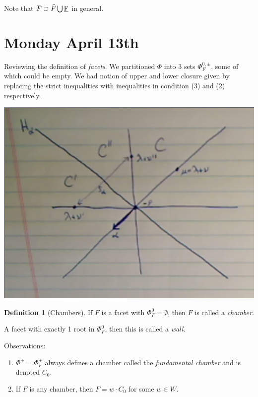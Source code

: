 \documentclass[11pt]{scrartcl}
\theoremstyle{definition}
\theoremstyle{theorem}
\theoremstyle{proof}
\theoremstyle{definition}
\newtheorem{definition}{Definition}[theorem]
\theoremstyle{break}
\theoremstyle{problem}
\providecommand{\tightlist}{%
  \setlength{\itemsep}{0pt}\setlength{\parskip}{0pt}}
\newcommand{\union}[0]{\bigcup}
\renewcommand{\bar}[1]{\mkern 1.5mu\overline{\mkern-1.5mu#1\mkern-1.5mu}\mkern 1.5mu}
\renewcommand{\hat}[1]{\widehat{#1}}
\begin{document}
Note that \(\bar F \supset \hat F \union \underbar F\) in general.

\hypertarget{monday-april-13th}{%
\section{Monday April 13th}\label{monday-april-13th}}

Reviewing the definition of \emph{facets}. We partitioned \(\Phi\) into
3 sets \(\Phi_F^{0, \pm}\), some of which could be empty. We had notion
of upper and lower closure given by replacing the strict inequalities
with inequalities in condition (3) and (2) respectively.

\includegraphics{figures/image_2020-04-13-09-07-07.png}\\

\begin{definition}[Chambers]

If \(F\) is a facet with \(\Phi_F^0=\emptyset\), then \(F\) is called a
\emph{chamber}.\end{definition}

A facet with exactly 1 root in \(\Phi_F^0\), then this is called a
\emph{wall}.

Observations:

\begin{enumerate}
\def\labelenumi{\arabic{enumi}.}
\tightlist
\item
  \(\Phi^+ = \Phi_F^+\) always defines a chamber called the
  \emph{fundamental chamber} and is denoted \(C_0\).
\item
  If \(F\) is any chamber, then \(F = w\cdot C_0\) for some \(w\in W\).
\end{enumerate}
\end{document}
